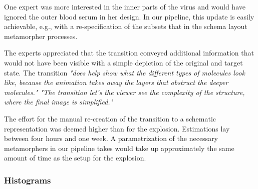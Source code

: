 One expert was more interested in the inner parts of the virus and would have ignored the outer blood serum in her design. In our pipeline, this update is easily achievable, e.g., with a re-specification of the subsets that in the schema layout metamorpher processes. 

The experts appreciated that the transition conveyed additional information that would not have been visible with a simple depiction of the original and target state.
The transition \textit{"does help show what the different types of molecules look like, because the animation takes away the layers that obstruct the deeper molecules."
"The transition let's the viewer see the complexity of the structure, where the final image is simplified."}








The effort for the manual re-creation of the transition to a schematic representation was deemed higher than for the explosion. Estimations lay between four hours and one week. A parametrization of the necessary metamorphers in our pipeline takes would take up approximately the same amount of time as the setup for the explosion.









\subsubsection{Histograms}

